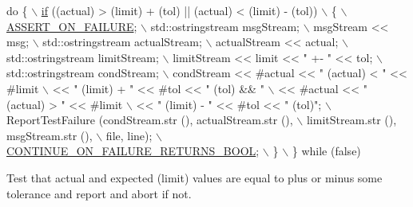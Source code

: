 \begin{DoxyCode}
\textcolor{keywordflow}{do} \{                                                                  \hyperlink{loss__ITU1238_8m_a419d895abe1313c35fa353c93802647e}{\(\backslash\)}
\hyperlink{loss__ITU1238_8m_a419d895abe1313c35fa353c93802647e}{    if} ((actual) > (limit) + (tol) || (actual) < (limit) - (tol))       \(\backslash\)
      \{                                                                 \hyperlink{group__testing_ga044d7c8c214fe3761af96ee3cbe2edc3}{\(\backslash\)}
\hyperlink{group__testing_ga044d7c8c214fe3761af96ee3cbe2edc3}{        ASSERT\_ON\_FAILURE};                                              \(\backslash\)
        std::ostringstream msgStream;                                   \(\backslash\)
        msgStream << msg;                                               \(\backslash\)
        std::ostringstream actualStream;                                \(\backslash\)
        actualStream << actual;                                         \(\backslash\)
        std::ostringstream limitStream;                                 \(\backslash\)
        limitStream << limit << \textcolor{stringliteral}{" +- "} << tol;                          \(\backslash\)
        std::ostringstream condStream;                                  \(\backslash\)
        condStream << #actual << \textcolor{stringliteral}{" (actual) < "} << #limit               \(\backslash\)
                   << \textcolor{stringliteral}{" (limit) + "} << #tol << \textcolor{stringliteral}{" (tol) && "}             \(\backslash\)
                   << #actual << \textcolor{stringliteral}{" (actual) > "} << #limit               \(\backslash\)
                   << \textcolor{stringliteral}{" (limit) - "} << #tol << \textcolor{stringliteral}{" (tol)"};                \(\backslash\)
        ReportTestFailure (condStream.str (), actualStream.str (),      \(\backslash\)
                       limitStream.str (), msgStream.str (),            \(\backslash\)
                       file, line);                                     \hyperlink{group__testing_gac69c0f4943a60d1dcecdcd793f905449}{\(\backslash\)}
\hyperlink{group__testing_gac69c0f4943a60d1dcecdcd793f905449}{        CONTINUE\_ON\_FAILURE\_RETURNS\_BOOL};                          
           \(\backslash\)
      \}                                                                 \(\backslash\)
  \} \textcolor{keywordflow}{while} (\textcolor{keyword}{false})
\end{DoxyCode}


Test that actual and expected (limit) values are equal to plus or minus some tolerance and report and abort if not. 

